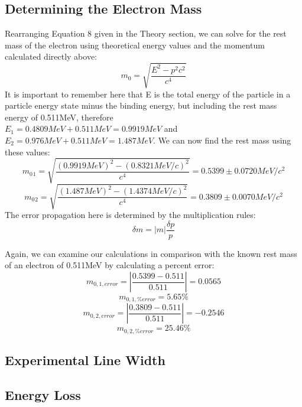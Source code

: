 \subsection{Determining the Electron Mass}
Rearranging Equation 8 given in the Theory section, we can solve for the rest mass of the electron using theoretical energy values and the momentum calculated directly above:
\begin{equation} m_0=\sqrt{\frac{E^2-p^2c^2}{c^4}}\end{equation}
It is important to remember here that E is the total energy of the particle in a particle energy state minus the binding energy, but including the rest mass energy of 0.511MeV, therefore \\$E_1=0.4809MeV+0.511MeV=0.9919MeV$ and $E_2=0.976MeV+0.511MeV=1.487MeV$. We can now find the rest mass using these values:
\begin{equation} m_0{_1}=\sqrt{\frac{(0.9919MeV)^2-(0.8321MeV/c)^2}{c^4}}=0.5399\pm0.0720 MeV/c^2\end{equation}
\begin{equation} m_0{_2}=\sqrt{\frac{(1.487MeV)^2-(1.4374MeV/c)^2}{c^4}}=0.3809\pm0.0070 MeV/c^2\end{equation}
The error propagation here is determined by the multiplication rules:
\begin{equation} \delta m= |m|\frac{\delta p}{p} \end {equation}

Again, we can examine our calculations in comparison with the known rest mass of an electron of 0.511MeV by calculating a percent error:
\begin{equation} m_{0,1,error}=|\frac{0.5399-0.511}{0.511}|=0.0565\end{equation}
\begin{equation} m_{0,1,\%error}=5.65\%\end{equation}
\begin{equation} m_{0,2,error}=|\frac{0.3809-0.511}{0.511}|=-0.2546\end{equation}
\begin{equation} m_{0,2,\%error}=25.46\%\end{equation}
\subsection{Experimental Line Width}
\subsection {Energy Loss}
